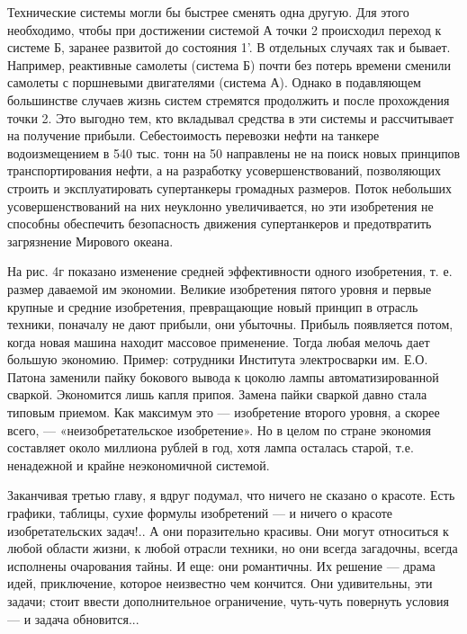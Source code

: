 Технические системы  могли бы быстрее  сменять одна другую.  Для этого
необходимо,  чтобы  при  достижении  системой  А  точки  2  происходил
переход к  системе Б,  заранее развитой до  состояния 1'.  В отдельных
случаях  так  и  бывает.  Например, реактивные  самолеты  (система  Б)
почти  без потерь  времени сменили  самолеты с  поршневыми двигателями
(система  А). Однако  в подавляющем  большинстве случаев  жизнь систем
стремятся продолжить и после прохождения точки 2. Это выгодно тем, кто
вкладывал средства в эти системы  и рассчитывает на получение прибыли.
Себестоимость  перевозки нефти  на танкере  водоизмещением в  540 тыс.
тонн  на 50%
направлены не на  поиск новых принципов транспортирования  нефти, а на
разработку усовершенствований,  позволяющих строить  и эксплуатировать
супертанкеры громадных размеров. Поток небольших усовершенствований на
них неуклонно увеличивается, но эти изобретения не способны обеспечить
безопасность  движения   супертанкеров  и   предотвратить  загрязнение
Мирового океана.

На   рис.  4г   показано   изменение   средней  эффективности   одного
изобретения, т.  е. размер  даваемой им экономии.  Великие изобретения
пятого  уровня и  первые крупные  и средние  изобретения, превращающие
новый  принцип  в  отрасль  техники, поначалу  не  дают  прибыли,  они
убыточны.  Прибыль  появляется  потом,   когда  новая  машина  находит
массовое применение. Тогда любая мелочь дает большую экономию. Пример:
сотрудники  Института электросварки  им.  Е.О.  Патона заменили  пайку
бокового вывода к цоколю  лампы автоматизированной сваркой. Экономится
лишь капля припоя.  Замена пайки сваркой давно  стала типовым приемом.
Как  максимум это  — изобретение  второго  уровня, а  скорее всего,  —
«неизобретательское  изобретение».  Но  в  целом  по  стране  экономия
составляет около  миллиона рублей в  год, хотя лампа  осталась старой,
т.е. ненадежной и крайне неэкономичной системой.

Заканчивая  третью главу,  я вдруг  подумал, что  ничего не  сказано о
красоте. Есть графики, таблицы, сухие формулы изобретений — и ничего о
красоте  изобретательских задач!..  А  они  поразительно красивы.  Они
могут относиться  к любой области  жизни, к любой отрасли  техники, но
они всегда  загадочны, всегда исполнены  очарования тайны. И  еще: они
романтичны. Их  решение — драма идей,  приключение, которое неизвестно
чем кончится. Они удивительны, эти задачи; стоит ввести дополнительное
ограничение, чуть-чуть повернуть условия — и задача обновится...

